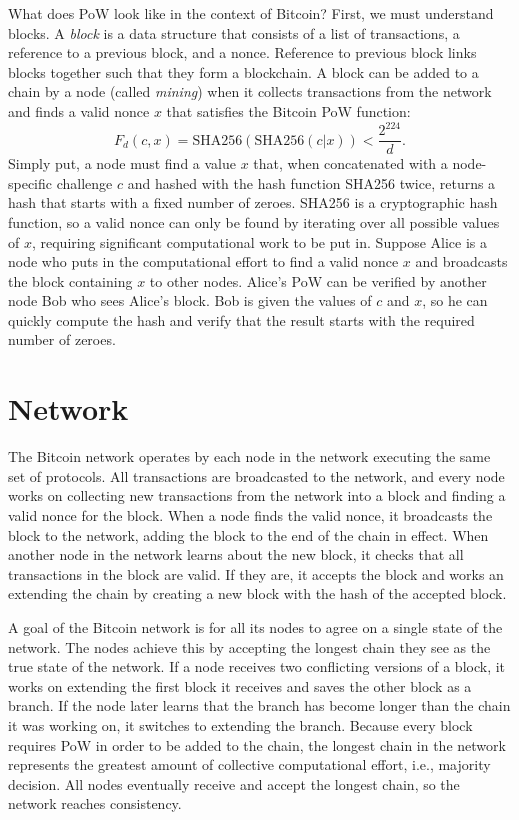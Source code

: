 \documentclass{article}
\begin{document}
What does PoW look like in the context of Bitcoin? First, we must understand
blocks. A \emph{block} is a data structure that consists of a list of
transactions, a reference to a previous block, and a nonce. Reference to
previous block links blocks together such that they form a blockchain. A block
can be added to a chain by a node (called \emph{mining}) when it collects
transactions from the network and finds a valid nonce $x$ that satisfies the
Bitcoin PoW function:
\[
  F_d (c,x) = \text{SHA256}(\text{SHA256}(c|x)) < \frac{2^{224}}{d}.
\]
Simply put, a node must find a value $x$ that, when concatenated with a
node-specific challenge $c$ and hashed with the hash function SHA256 twice,
returns a hash that starts with a fixed number of zeroes. SHA256 is a
cryptographic hash function, so a valid nonce can only be found by iterating
over all possible values of $x$, requiring significant computational work to be
put in. Suppose Alice is a node who puts in the computational effort to find a
valid nonce $x$ and broadcasts the block containing $x$ to other nodes. Alice’s
PoW can be verified by another node Bob who sees Alice’s block. Bob is given the
values of $c$ and $x$, so he can quickly compute the hash and verify that the
result starts with the required number of zeroes.

\section{Network}

The Bitcoin network operates by each node in the network executing the same set
of protocols. All transactions are broadcasted to the network, and every node
works on collecting new transactions from the network into a block and finding a
valid nonce for the block. When a node finds the valid nonce, it broadcasts the
block to the network, adding the block to the end of the chain in effect. When
another node in the network learns about the new block, it checks that all
transactions in the block are valid. If they are, it accepts the block and works
an extending the chain by creating a new block with the hash of the accepted
block.

A goal of the Bitcoin network is for all its nodes to agree on a single state of
the network. The nodes achieve this by accepting the longest chain they see as
the true state of the network. If a node receives two conflicting versions of a
block, it works on extending the first block it receives and saves the other
block as a branch. If the node later learns that the branch has become longer
than the chain it was working on, it switches to extending the branch. Because
every block requires PoW in order to be added to the chain, the longest chain in
the network represents the greatest amount of collective computational effort,
i.e., majority decision. All nodes eventually receive and accept the longest
chain, so the network reaches consistency.
\end{document}
